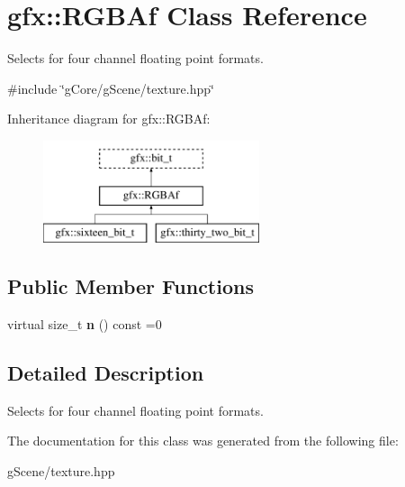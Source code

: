 \hypertarget{classgfx_1_1RGBAf}{\section{gfx\-:\-:R\-G\-B\-Af Class Reference}
\label{classgfx_1_1RGBAf}
}


Selects for four channel floating point formats.  




{\ttfamily \#include \char`\"{}g\-Core/g\-Scene/texture.\-hpp\char`\"{}}

Inheritance diagram for gfx\-:\-:R\-G\-B\-Af\-:\begin{figure}[H]
\begin{center}
\leavevmode
\includegraphics[height=3.000000cm]{classgfx_1_1RGBAf}
\end{center}
\end{figure}
\subsection*{Public Member Functions}
\begin{DoxyCompactItemize}
\item 
\hypertarget{classgfx_1_1RGBAf_a27e98c9c08c06b9e425dc1b0af22ad56}{virtual size\-\_\-t {\bfseries n} () const =0}\label{classgfx_1_1RGBAf_a27e98c9c08c06b9e425dc1b0af22ad56}

\end{DoxyCompactItemize}


\subsection{Detailed Description}
Selects for four channel floating point formats. 

The documentation for this class was generated from the following file\-:\begin{DoxyCompactItemize}
\item 
g\-Scene/texture.\-hpp\end{DoxyCompactItemize}
